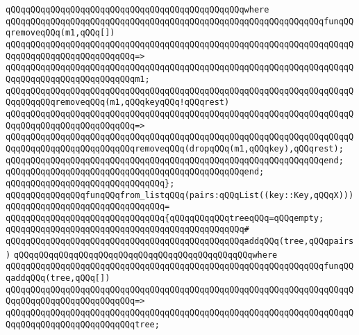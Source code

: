 \verb|qQQqqQQqqQQqqQQqqQQqqQQqqQQqqQQqqQQqqQQqqQQqqQQqwhere|\newline
\verb|qQQqqQQqqQQqqQQqqQQqqQQqqQQqqQQqqQQqqQQqqQQqqQQqqQQqqQQqqQQqqQQqfunqQQqremoveqQQq(m1,qQQq[])|\newline
\verb|qQQqqQQqqQQqqQQqqQQqqQQqqQQqqQQqqQQqqQQqqQQqqQQqqQQqqQQqqQQqqQQqqQQqqQQqqQQqqQQqqQQqqQQqqQQqqQQq=>|\newline
\verb|qQQqqQQqqQQqqQQqqQQqqQQqqQQqqQQqqQQqqQQqqQQqqQQqqQQqqQQqqQQqqQQqqQQqqQQqqQQqqQQqqQQqqQQqqQQqqQQqm1;|\newline
\newline
\verb|qQQqqQQqqQQqqQQqqQQqqQQqqQQqqQQqqQQqqQQqqQQqqQQqqQQqqQQqqQQqqQQqqQQqqQQqqQQqqQQqremoveqQQq(m1,qQQqkeyqQQq!qQQqrest)|\newline
\verb|qQQqqQQqqQQqqQQqqQQqqQQqqQQqqQQqqQQqqQQqqQQqqQQqqQQqqQQqqQQqqQQqqQQqqQQqqQQqqQQqqQQqqQQqqQQqqQQq=>|\newline
\verb|qQQqqQQqqQQqqQQqqQQqqQQqqQQqqQQqqQQqqQQqqQQqqQQqqQQqqQQqqQQqqQQqqQQqqQQqqQQqqQQqqQQqqQQqqQQqqQQqremoveqQQq(dropqQQq(m1,qQQqkey),qQQqrest);|\newline
\verb|qQQqqQQqqQQqqQQqqQQqqQQqqQQqqQQqqQQqqQQqqQQqqQQqqQQqqQQqqQQqqQQqend;|\newline
\verb|qQQqqQQqqQQqqQQqqQQqqQQqqQQqqQQqqQQqqQQqqQQqqQQqend;|\newline
\verb|qQQqqQQqqQQqqQQqqQQqqQQqqQQqqQQq};|\newline
\newline
\verb|qQQqqQQqqQQqqQQqfunqQQqfrom_listqQQq(pairs:qQQqList((key::Key,qQQqX)))|\newline
\verb|qQQqqQQqqQQqqQQqqQQqqQQqqQQqqQQq=|\newline
\verb|qQQqqQQqqQQqqQQqqQQqqQQqqQQqqQQq{qQQqqQQqqQQqtreeqQQq=qQQqempty;|\newline
\verb|qQQqqQQqqQQqqQQqqQQqqQQqqQQqqQQqqQQqqQQqqQQqqQQq#|\newline
\verb|qQQqqQQqqQQqqQQqqQQqqQQqqQQqqQQqqQQqqQQqqQQqqQQqaddqQQq(tree,qQQqpairs)|\newline
\verb|qQQqqQQqqQQqqQQqqQQqqQQqqQQqqQQqqQQqqQQqqQQqqQQqwhere|\newline
\verb|qQQqqQQqqQQqqQQqqQQqqQQqqQQqqQQqqQQqqQQqqQQqqQQqqQQqqQQqqQQqqQQqfunqQQqaddqQQq(tree,qQQq[])|\newline
\verb|qQQqqQQqqQQqqQQqqQQqqQQqqQQqqQQqqQQqqQQqqQQqqQQqqQQqqQQqqQQqqQQqqQQqqQQqqQQqqQQqqQQqqQQqqQQqqQQq=>|\newline
\verb|qQQqqQQqqQQqqQQqqQQqqQQqqQQqqQQqqQQqqQQqqQQqqQQqqQQqqQQqqQQqqQQqqQQqqQQqqQQqqQQqqQQqqQQqqQQqqQQqtree;|\newline
